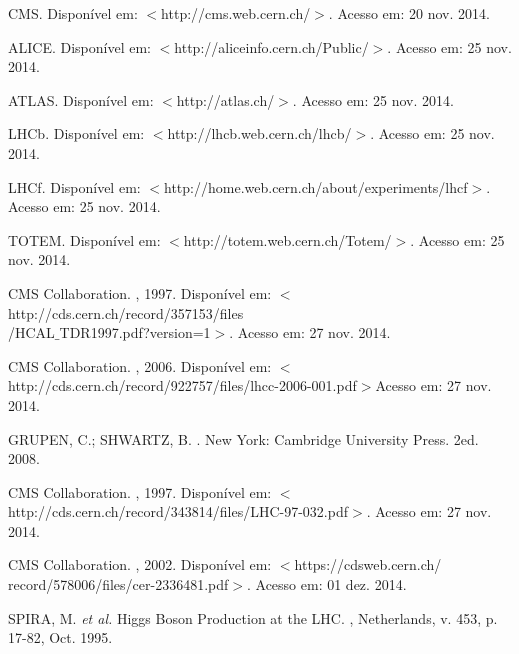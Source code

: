 \begin{thebibliography}{}
CMS.
\newblock Disponível em: $<$http://cms.web.cern.ch/$>$. Acesso em: 20 nov. 2014.

ALICE.
\newblock Disponível em: $<$http://aliceinfo.cern.ch/Public/$>$. Acesso em: 25 nov. 2014.

ATLAS.
\newblock Disponível em: $<$http://atlas.ch/$>$. Acesso em: 25 nov. 2014.

LHCb.
\newblock Disponível em: $<$http://lhcb.web.cern.ch/lhcb/$>$. Acesso em: 25 nov. 2014.

LHCf.
\newblock Disponível em: $<$http://home.web.cern.ch/about/experiments/lhcf$>$. Acesso em: 25 nov. 2014.

TOTEM.
\newblock Disponível em: $<$http://totem.web.cern.ch/Totem/$>$. Acesso em: 25 nov. 2014.

CMS Collaboration.
, 1997.
\newblock Disponível em: $<$http://cds.cern.ch/record/357153/files\\/HCAL$\_$TDR1997.pdf?version=1$>$. Acesso em: 27 nov. 2014.

CMS Collaboration.
, 2006.
\newblock Disponível em: $<$http://cds.cern.ch/record/922757/files/lhcc-2006-001.pdf$>$Acesso em: 27 nov. 2014.

GRUPEN, C.; SHWARTZ, B.
.
\newblock New York: Cambridge University Press. 2ed. 2008.


CMS Collaboration.
, 1997.
\newblock Disponível em: $<$http://cds.cern.ch/record/343814/files/LHC-97-032.pdf$>$. Acesso em: 27 nov. 2014.

CMS Collaboration.
, 2002.
\newblock Disponível em: $<$https://cdsweb.cern.ch/\\record/578006/files/cer-2336481.pdf$>$. Acesso em: 01 dez. 2014.

SPIRA, M. \textit{et al.}
\newblock Higgs Boson Production at the LHC.
, Netherlands, v. 453, p. 17-82, Oct. 1995.


\end{thebibliography}
